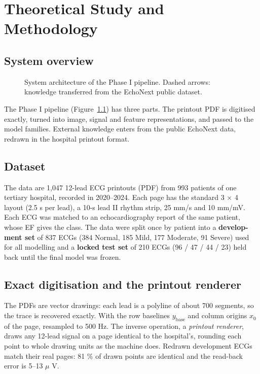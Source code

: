 \chapter{Theoretical Study and Methodology}\label{ch:3}

\section{System overview}\label{sec:3.1}

\begin{figure}[htbp]
\centering
\resizebox{\ifdim\width>\linewidth\linewidth\else\width\fi}{!}{}
\caption{System architecture of the Phase I pipeline. Dashed arrows: knowledge transferred from the EchoNext public dataset.}\label{fig:3.1}
\end{figure}

The Phase I pipeline (Figure~\ref{fig:3.1}) has three parts. The printout PDF is digitised exactly, turned into image, signal and feature representations, and passed to the model families. External knowledge enters from the public EchoNext data, redrawn in the hospital printout format.

\section{Dataset}\label{sec:3.2}

The data are 1,047 12-lead ECG printouts (PDF) from 993 patients of one tertiary hospital, recorded in 2020--2024. Each page has the standard 3 $\times$ 4 layout (2.5 s per lead), a 10-s lead II rhythm strip, 25 mm/s and 10 mm/mV. Each ECG was matched to an echocardiography report of the same patient, whose EF gives the class. The data were split once by patient into a \textbf{develop-} \textbf{ment set} of 837 ECGs (384 Normal, 185 Mild, 177 Moderate, 91 Severe) used for all modelling and a \textbf{locked test set} of 210 ECGs (96 / 47 / 44 / 23) held back until the final model was frozen.

\section{Exact digitisation and the printout renderer}\label{sec:3.3}

The PDFs are vector drawings: each lead is a polyline of about 700 segments, so the trace is recovered exactly. With the row baselines $y_{\text{base}}$ and column origins $ x_{0}$ of the page,
\EqThreeOne
resampled to 500 Hz. The inverse operation, a \emph{printout renderer}, draws any 12-lead signal on a page identical to the hospital's, rounding each point to whole drawing units as the machine does. Redrawn development ECGs match their real pages: 81 \% of drawn points are identical and the read-back error is 5--13 $\mu$ V.

